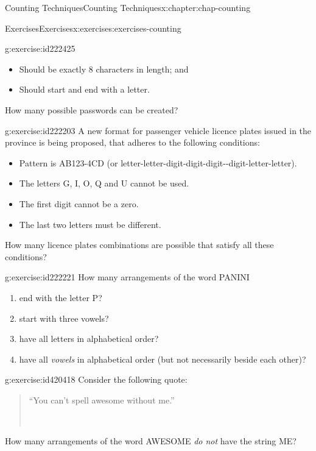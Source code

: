 \documentclass[oneside,10pt,]{book}
\numberwithin{equation}{section}
\begin{document}
\begin{chapterptx}{Counting Techniques}{}{Counting Techniques}{}{}{x:chapter:chap-counting}
\begin{exercises-section}{Exercises}{}{Exercises}{}{}{x:exercises:exercises-counting}
\begin{divisionexercise}{2}{}{}{g:exercise:id222425}
\begin{itemize}[label=\textbullet]
\item{}Should be exactly 8 characters in length; and%
\item{}Should start and end with a letter.%
\end{itemize}
How many possible passwords can be created?%
\end{divisionexercise}%
\begin{divisionexercise}{3}{}{}{g:exercise:id222203}%
A new format for passenger vehicle licence plates issued in the province is being proposed, that adheres to the following conditions:%
\begin{itemize}[label=\textbullet]
\item{}Pattern is AB123-4CD (or letter-letter-digit-digit-digit-{}-{}digit-letter-letter).%
\item{}The letters G, I, O, Q and U cannot be used.%
\item{}The first digit cannot be a zero.%
\item{}The last two letters must be different.%
\end{itemize}
How many licence plates combinations are possible that satisfy all these conditions?%
\end{divisionexercise}%
\begin{divisionexercise}{4}{}{}{g:exercise:id222221}%
How many arrangements of the word PANINI%
\begin{enumerate}[label=(\alph*)]
\item{}end with the letter P?%
\item{}start with three vowels?%
\item{}have all letters in alphabetical order?%
\item{}have all \emph{vowels} in alphabetical order (but not necessarily beside each other)?%
\end{enumerate}
%
\end{divisionexercise}%
\begin{divisionexercise}{5}{}{}{g:exercise:id420418}%
Consider the following quote:%
\begin{quote}%
``You can't spell awesome without me.''%
\nopagebreak\par%
\hfill{}\\\par
\end{quote}
How many arrangements of the word AWESOME \emph{do not} have the string ME?%

\end{divisionexercise}
\end{exercises-section}
\end{chapterptx}
\end{document}
